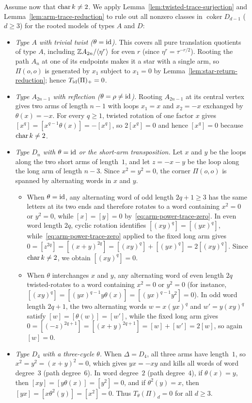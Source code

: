 Assume now that $\operatorname{char} k\ne2$. We apply Lemma~\ref{lem:twisted-trace-surjection} and Lemma~\ref{lem:arm-trace-reduction} to rule out all nonzero classes in $\operatorname{coker}D_{d-1}$ ($d\geq3$) for the rooted models of types $A$ and $D$:
\begin{itemize}
\item \emph{Type $A$ with trivial twist ($\theta=\operatorname{id}$).} This covers all pure translation quotients of type $A$, including $\mathbb Z A_{2n}/\langle\eta^r\rangle$ for even $r$ (since $\eta^r=\tau^{-r/2}$). Rooting the path $A_n$ at one of its endpoints makes it a star with a single arm, so $\Pi(o,o)$ is generated by $x_1$ subject to $x_1=0$ by Lemma~\ref{lem:star-return-reduction}; hence $T_{\operatorname{id}}(\Pi)_+=0$.
\item \emph{Type $A_{2n-1}$ with reflection ($\theta=\rho\ne\operatorname{id}$).} Rooting $A_{2n-1}$ at its central vertex gives two arms of length $n-1$ with loops $x_1=x$ and $x_2=-x$ exchanged by $\theta(x)=-x$. For every $q\geq1$, twisted rotation of one factor $x$ gives $[x^q]=[x^{q-1}\theta(x)]=-[x^q]$, so $2[x^q]=0$ and hence $[x^q]=0$ because $\operatorname{char} k\ne2$.
\item \emph{Type $D_n$ with $\theta=\operatorname{id}$ or the short-arm transposition.} Let $x$ and $y$ be the loops along the two short arms of length~$1$, and let $z=-x-y$ be the loop along the long arm of length $n-3$. Since $x^2=y^2=0$, the corner $\Pi(o,o)$ is spanned by alternating words in $x$ and $y$.
  \begin{itemize}
  \item When $\theta=\operatorname{id}$, any alternating word of odd length $2q+1\geq3$ has the same letters at its two ends and therefore rotates to a word containing $x^2=0$ or $y^2=0$, while $[x]=[y]=0$ by~\eqref{eq:arm-power-trace-zero}. In even word length $2q$, cyclic rotation identifies $[(xy)^q]=[(yx)^q]$, while~\eqref{eq:arm-power-trace-zero} applied to the fixed long arm gives $0=[z^{2q}]=[(x+y)^{2q}]=[(xy)^q]+[(yx)^q]=2[(xy)^q]$. Since $\operatorname{char} k\ne2$, we obtain $[(xy)^q]=0$.
  \item When $\theta$ interchanges $x$ and $y$, any alternating word of even length $2q$ twisted-rotates to a word containing $x^2=0$ or $y^2=0$ (for instance, $[(xy)^q]=[(yx)^{q-1}y\theta(x)]=[(yx)^{q-1}y^2]=0$). In odd word length $2q+1$, the two alternating words $w=x(yx)^q$ and $w'=y(xy)^q$ satisfy $[w]=[\theta(w)]=[w']$, while the fixed long arm gives $0=[(-z)^{2q+1}]=[(x+y)^{2q+1}]=[w]+[w']=2[w]$, so again $[w]=0$.
  \end{itemize}
\item \emph{Type $D_4$ with a three-cycle $\theta$.} When $\Delta=D_4$, all three arms have length~$1$, so $x^2=y^2=(x+y)^2=0$, which gives $yx=-xy$ and kills all words of word degree~$3$ (path degree~$6$). In word degree~$2$ (path degree~$4$), if $\theta(x)=y$, then $[xy]=[y\theta(x)]=[y^2]=0$, and if $\theta^2(y)=x$, then $[yx]=[x\theta^2(y)]=[x^2]=0$. Thus $T_\theta(\Pi)_d=0$ for all $d\geq3$.
\end{itemize}

